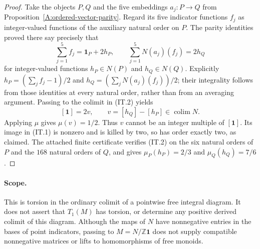 \begin{proof}
Take the objects $P,Q$ and the five embeddings $a_j:P\to Q$ from
Proposition~\ref{A:ordered-vector-parity}. Regard its five indicator
functions $f_j$ as integer-valued functions of the auxiliary natural
order on $P$. The parity identities proved there say precisely that
\[
 \sum_{j=1}^{5}f_j=\mathbf1_P+2h_P,
 \qquad
 \sum_{j=1}^{5}N(a_j)(f_j)=2h_Q
 \tag{IT.2}
\]
for integer-valued functions $h_P\in N(P)$ and $h_Q\in N(Q)$.
Explicitly $h_P=(\sum_jf_j-1)/2$ and
$h_Q=(\sum_jN(a_j)(f_j))/2$; their integrality follows from those
identities at every natural order, rather than from an averaging
argument. Passing to the colimit in (IT.2) yields
\[
 [\mathbf1]=2v,
 \qquad v=[h_Q]-[h_P]\in\operatorname{colim}N.
\]
Applying $\mu$ gives $\mu(v)=1/2$. Thus $v$ cannot be an integer
multiple of $[\mathbf1]$. Its image in (IT.1) is nonzero and is
killed by two, so has order exactly two, as claimed. The attached
finite certificate verifies (IT.2) on the six natural orders of $P$
and the $168$ natural orders of $Q$, and gives
$\mu_P(h_P)=2/3$ and $\mu_Q(h_Q)=7/6$.
\end{proof}

\paragraph{Scope.}
This is torsion in the ordinary colimit of a pointwise free integral
diagram. It does not assert that $T_1(M)$ has torsion, or determine
any positive derived colimit of this diagram. Although the maps of
$N$ have nonnegative entries in the bases of point indicators,
passing to $M=N/\mathbb Z\mathbf1$ does not supply compatible
nonnegative matrices or lifts to homomorphisms of free monoids.

